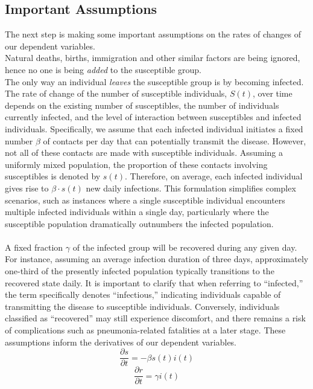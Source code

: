 \subsection{Important Assumptions}
\hspace{\parindent}The next step is making some important assumptions on the rates of changes of our dependent variables.\\
Natural deaths, births, immigration and other similar factors are being ignored, hence no one is being \textit{added} to the susceptible group.\\
The only way an individual \textit{leaves} the susceptible group is by becoming infected.\\
The rate of change of the number of susceptible individuals, $S(t)$, over time depends on the existing number of susceptibles, the number of individuals currently infected, and the level of interaction between susceptibles and infected individuals.
Specifically, we assume that each infected individual initiates a fixed number $\beta$ of contacts per day that can potentially transmit the disease.
However, not all of these contacts are made with susceptible individuals.
Assuming a uniformly mixed population, the proportion of these contacts involving susceptibles is denoted by $s(t)$.
Therefore, on average, each infected individual gives rise to $\beta \cdot s(t)$ new daily infections.
This formulation simplifies complex scenarios, such as instances where a single susceptible individual encounters multiple infected individuals within a single day, particularly where the susceptible population dramatically outnumbers the infected population.\\
\\
A fixed fraction $\gamma$ of the infected group will be recovered during any given day.
For instance, assuming an average infection duration of three days, approximately one-third of the presently infected population typically transitions to the recovered state daily.
It is important to clarify that when referring to ``infected,'' the term specifically denotes ``infectious,'' indicating individuals capable of transmitting the disease to susceptible individuals.
Conversely, individuals classified as ``recovered'' may still experience discomfort, and there remains a risk of complications such as pneumonia-related fatalities at a later stage.
These assumptions inform the derivatives of our dependent variables.
\begin{equation}
    \frac{\partial s}{\partial t} = -\beta s(t)  i(t)
\end{equation}
\begin{equation}
    \frac{\partial r}{\partial t} = \gamma i(t)
\end{equation}

